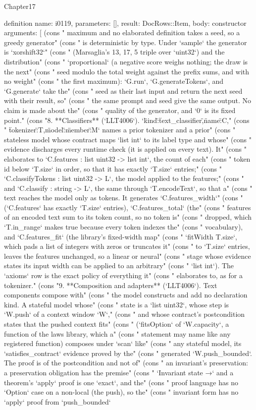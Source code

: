 \begin{lexlean}{Chapter17}
\begin{semanticmodule}
definition{
  name: i0119,
  parameters: [],
  result: DocRows::Item,
  body: constructor{
    arguments: [
      (cons "   maximum and no elaborated definition takes a seed, so a greedy generator" (cons "   is deterministic by type. Under `sample` the generator is `xorshift32`" (cons "   (Marsaglia's 13, 17, 5 triple over `uint32`) and the distribution" (cons "   `proportional` (a negative score weighs nothing; the draw is the next" (cons "   seed modulo the total weight against the prefix sums, and with no weight" (cons "   the first maximum): `G.run`, `G.generateTokens`, and `G.generate` take the" (cons "   seed as their last input and return the next seed with their result, so" (cons "   the same prompt and seed give the same output. No claim is made about the" (cons "   quality of the generator, and `0` is its fixed point." (cons "8. **Classifiers** (`LLT4006`). `{\"kind\":\"text_classifier\",\"name\":C," (cons "   \"tokenizer\":T,\"model\":{\"member\":M}}` names a prior tokenizer and a prior" (cons "   stateless model whose contract maps `list int` to its label type and whose" (cons "   evidence discharges every runtime check (it is applied on every text). It" (cons "   elaborates to `C.features : list uint32 -> list int`, the count of each" (cons "   token id below `T.size` in order, so that it has exactly `T.size` entries;" (cons "   `C.classifyTokens : list uint32 -> L`, the model applied to the features;" (cons "   and `C.classify : string -> L`, the same through `T.encodeText`, so that a" (cons "   text reaches the model only as tokens. It generates `C.features_width`" (cons "   (`C.features` has exactly `T.size` entries), `C.features_total` (the" (cons "   features of an encoded text sum to its token count, so no token is" (cons "   dropped, which `T.in_range` makes true because every token indexes the" (cons "   vocabulary), and `C.features_fit` (the library's fixed-width map" (cons "   `fitWidth T.size`, which pads a list of integers with zeros or truncates it" (cons "   to `T.size` entries, leaves the features unchanged, so a linear or neural" (cons "   stage whose evidence states its input width can be applied to an arbitrary" (cons "   `list int`). The `axioms` row is the exact policy of everything it" (cons "   elaborates to, as for a tokenizer." (cons "9. **Composition and adapters** (`LLT4006`). Text components compose with" (cons "   the model constructs and add no declaration kind. A stateful model whose" (cons "   state is a `list uint32`, whose step is `W.push` of a context window `W`," (cons "   and whose contract's postcondition states that the pushed context fits" (cons "   (`fitsOption` of `W.capacity`, a function of the laws library, which a" (cons "   statement may name like any registered function) composes under `scan` like" (cons "   any stateful model, its `satisfies_contract` evidence proved by the" (cons "   generated `W.push_bounded`. The proof is of the postcondition and not of" (cons "   an invariant's preservation: a preservation obligation has the premise" (cons "   `Invariant state →` and a theorem's `apply` proof is one `exact`, and the" (cons "   proof language has no `Option` case on a non-local (the push), so the" (cons "   invariant form has no `apply` proof from `push_bounded` }}
\end{semanticmodule}
\end{lexlean}
